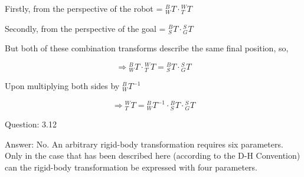 \documentclass[a4paper]{article}
\begin{document}
\begin{qalist}
			Firstly, from the perspective of the robot = ${}^{B}_{W}T \cdot {}^{W}_{T}T$
			
			Secondly, from the perspective of the goal = ${}^{B}_{S}T \cdot {}^{S}_{G}T$
			
			But both of these combination transforms describe the same final position, so,
			
			\[\Rightarrow {}^{B}_{W}T \cdot {}^{W}_{T}T = {}^{B}_{S}T \cdot {}^{S}_{G}T\]
			
			Upon multiplying both sides by ${}^{B}_{W}{T}^{-1}$
			
			\[\Rightarrow {}^{W}_{T}T = {}^{B}_{W}{T}^{-1} \cdot {}^{B}_{S}T \cdot {}^{S}_{G}T\]
		
		\item[Question: 3.12] \setcounter{equation}{0} %
		\item[Answer:] No. An arbitrary rigid-body transformation requires six parameters. Only in the case that has been described here (according to the D-H Convention) can the rigid-body transformation be expressed with four parameters.
		

\end{qalist}
\end{document}
